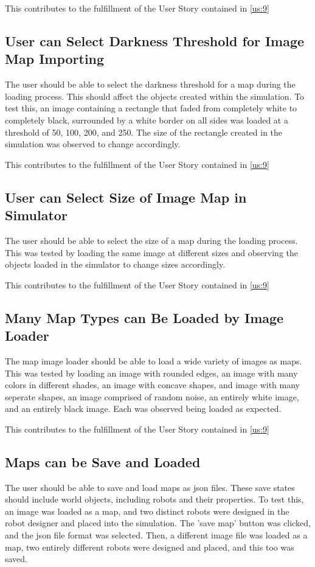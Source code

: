 This contributes to the fulfillment of the User Story contained in \ref{us:9}

\subsection{User can Select Darkness Threshold for Image Map Importing}
The user should be able to select the darkness threshold for a map during the loading process. This should affect the objects created within the simulation. To test this, an image containing a rectangle that faded from completely white to completely black, surrounded by a white border on all sides was loaded at a threshold of 50, 100, 200, and 250. The size of the rectangle created in the simulation was observed to change accordingly.

This contributes to the fulfillment of the User Story contained in \ref{us:9}

\subsection{User can Select Size of Image Map in Simulator}
The user should be able to select the size of a map during the loading process. This was tested by loading the same image at different sizes and observing the objects loaded in the simulator to change sizes accordingly.

This contributes to the fulfillment of the User Story contained in \ref{us:9}

\subsection{Many Map Types can Be Loaded by Image Loader}
The map image loader should be able to load a wide variety of images as maps. This was tested by loading an image with rounded edges, an image with many colors in different shades, an image with concave shapes, and image with many seperate shapes, an image comprised of random noise, an entirely white image, and an entirely black image. Each was observed being loaded as expected.

This contributes to the fulfillment of the User Story contained in \ref{us:9}

\subsection{Maps can be Save and Loaded}
The user should be able to save and load maps as json files. These save states should include world objects, including robots and their properties. To test this, an image was loaded as a map, and two distinct robots were designed in the robot designer and placed into the simulation. The 'save map' button was clicked, and the json file format was selected. Then, a different image file was loaded as a map, two entirely different robots were designed and placed, and this too was saved. 

